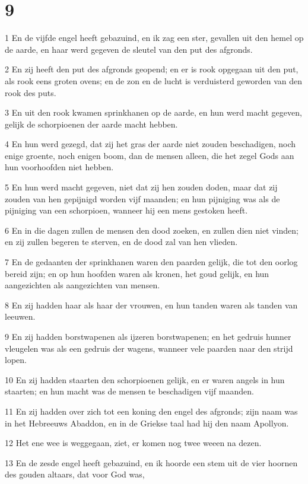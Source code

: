 \chapter{9}

\par 1 En de vijfde engel heeft gebazuind, en ik zag een ster, gevallen uit den hemel op de aarde, en haar werd gegeven de sleutel van den put des afgronds.
\par 2 En zij heeft den put des afgronds geopend; en er is rook opgegaan uit den put, als rook eens groten ovens; en de zon en de lucht is verduisterd geworden van den rook des puts.
\par 3 En uit den rook kwamen sprinkhanen op de aarde, en hun werd macht gegeven, gelijk de schorpioenen der aarde macht hebben.
\par 4 En hun werd gezegd, dat zij het gras der aarde niet zouden beschadigen, noch enige groente, noch enigen boom, dan de mensen alleen, die het zegel Gods aan hun voorhoofden niet hebben.
\par 5 En hun werd macht gegeven, niet dat zij hen zouden doden, maar dat zij zouden van hen gepijnigd worden vijf maanden; en hun pijniging was als de pijniging van een schorpioen, wanneer hij een mens gestoken heeft.
\par 6 En in die dagen zullen de mensen den dood zoeken, en zullen dien niet vinden; en zij zullen begeren te sterven, en de dood zal van hen vlieden.
\par 7 En de gedaanten der sprinkhanen waren den paarden gelijk, die tot den oorlog bereid zijn; en op hun hoofden waren als kronen, het goud gelijk, en hun aangezichten als aangezichten van mensen.
\par 8 En zij hadden haar als haar der vrouwen, en hun tanden waren als tanden van leeuwen.
\par 9 En zij hadden borstwapenen als ijzeren borstwapenen; en het gedruis hunner vleugelen was als een gedruis der wagens, wanneer vele paarden naar den strijd lopen.
\par 10 En zij hadden staarten den schorpioenen gelijk, en er waren angels in hun staarten; en hun macht was de mensen te beschadigen vijf maanden.
\par 11 En zij hadden over zich tot een koning den engel des afgronds; zijn naam was in het Hebreeuws Abaddon, en in de Griekse taal had hij den naam Apollyon.
\par 12 Het ene wee is weggegaan, ziet, er komen nog twee weeen na dezen.
\par 13 En de zesde engel heeft gebazuind, en ik hoorde een stem uit de vier hoornen des gouden altaars, dat voor God was,
